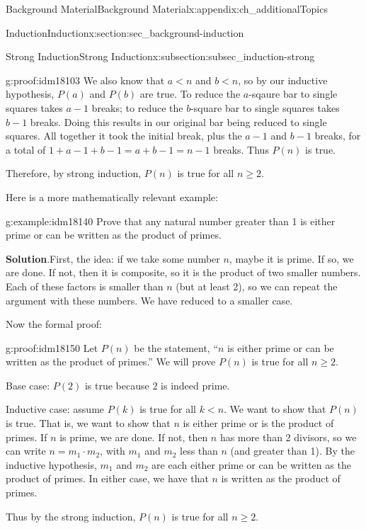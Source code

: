 \documentclass[oneside,10pt,]{book}
\numberwithin{equation}{chapter}
\newcommand{\lt}{<}
\begin{document}
\begin{appendixptx}{Background Material}{}{Background Material}{}{}{x:appendix:ch_additionalTopics}
\begin{sectionptx}{Induction}{}{Induction}{}{}{x:section:sec_background-induction}
\begin{subsectionptx}{Strong Induction}{}{Strong Induction}{}{}{x:subsection:subsec_induction-strong}
\begin{proofptx}{}{g:proof:idm18103}
We also know that \(a \lt n\) and \(b \lt n\), so by our inductive hypothesis, \(P(a)\) and \(P(b)\) are true.  To reduce the \(a\)-sqaure bar to single squares takes \(a-1\) breaks; to reduce the \(b\)-square bar to single squares takes \(b-1\) breaks.  Doing this results in our original bar being reduced to single squares.  All together it took the initial break, plus the \(a-1\) and \(b-1\) breaks, for a total of \(1+a-1+b-1 = a+b-1 = n-1\) breaks.  Thus \(P(n)\) is true.%
\par
Therefore, by strong induction, \(P(n)\) is true for all \(n \ge 2\).%
\end{proofptx}
Here is a more mathematically relevant example:%
\begin{example}{}{g:example:idm18140}%
Prove that any natural number greater than 1 is either prime or can be written as the product of primes.%
\par\smallskip%
\noindent\textbf{Solution}.\hypertarget{g:solution:idm18145}{}\quad{}First, the idea: if we take some number \(n\), maybe it is prime. If so, we are done. If not, then it is composite, so it is the product of two smaller numbers. Each of these factors is smaller than \(n\) (but at least 2), so we can repeat the argument with these numbers. We have reduced to a smaller case.%
\par
Now the formal proof:%
\begin{proofptx}{}{g:proof:idm18150}
Let \(P(n)\) be the statement, ``\(n\) is either prime or can be written as the product of primes.'' We will prove \(P(n)\) is true for all \(n \ge 2\).%
\par
Base case: \(P(2)\) is true because \(2\) is indeed prime.%
\par
Inductive case: assume \(P(k)\) is true for all \(k \lt  n\). We want to show that \(P(n)\) is true. That is, we want to show that \(n\) is either prime or is the product of primes. If \(n\) is prime, we are done. If not, then \(n\) has more than 2 divisors, so we can write \(n = m_1 \cdot m_2\), with \(m_1\) and \(m_2\) less than \(n\) (and greater than 1). By the inductive hypothesis, \(m_1\) and \(m_2\) are each either prime or can be written as the product of primes. In either case, we have that \(n\) is written as the product of primes.%
\par
Thus by the strong induction, \(P(n)\) is true for all \(n \ge 2\).%
\end{proofptx}
\end{example}

\end{subsectionptx}
\end{sectionptx}
\end{appendixptx}
\end{document}
